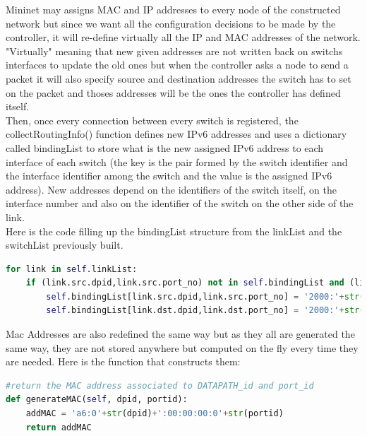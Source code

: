 \documentclass{article}
\begin{document}
Mininet may assigns MAC and IP addresses to every node of the
constructed network but since we want all the configuration decisions
to be made by the controller, it will re-define virtually all the IP
and MAC addresses of the network. "Virtually" meaning that new given
addresses are not written back on switchs interfaces to update the old
ones but when the controller asks a node to send a packet it will also
specify source and destination addresses the switch has to set on the
packet and thoses addresses will be the ones the controller has
defined itself.\\
\newline
Then, once every connection between every switch is registered, the
collectRoutingInfo() function defines new IPv6 addresses and uses a
dictionary called bindingList to store what is the new assigned IPv6
address to each interface of each switch (the key is the pair formed
by the switch identifier and the interface identifier among the switch
and the value is the assigned IPv6 address). New addresses depend on
the identifiers of the switch itself, on the interface number and also
on the identifier of the switch on the other side of the link.\\
\newline
Here is the code filling up the bindingList structure from the linkList
and the switchList previously built.

\begin{lstlisting}[frame=single,language=Python,breaklines=true] 
for link in self.linkList:
    if (link.src.dpid,link.src.port_no) not in self.bindingList and (link.dst.dpid,link.dst.port_no) not in self.bindingList :
        self.bindingList[link.src.dpid,link.src.port_no] = '2000:'+str(link.src.dpid)+str(link.dst.dpid)+'::'+str(link.src.dpid)
        self.bindingList[link.dst.dpid,link.dst.port_no] = '2000:'+str(link.src.dpid)+str(link.dst.dpid)+'::'+str(link.dst.dpid)
\end{lstlisting}

Mac Addresses are also redefined the same way but as they all are
generated the same way, they are not stored anywhere but computed on
the fly every time they are needed. Here is the function that
constructs them:

\begin{lstlisting}[frame=single,language=Python,breaklines=true] 
#return the MAC address associated to DATAPATH_id and port_id
def generateMAC(self, dpid, portid):
    addMAC = 'a6:0'+str(dpid)+':00:00:00:0'+str(portid)
    return addMAC
\end{lstlisting}
\end{document}
